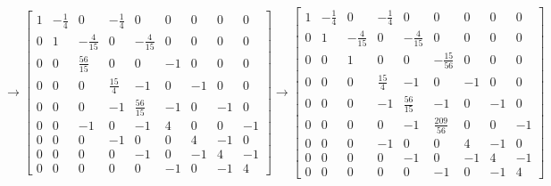 \documentclass[a4paper]{article}
\begin{document}
$$
\rightarrow\left[\begin{array}{ccccccccc}
	1 & -\frac{1}{4} & 0 & -\frac{1}{4} & 0 & 0 & 0 & 0 & 0 \\
	0 & 1 & -\frac{4}{15} & 0 & -\frac{4}{15} & 0 & 0 & 0 & 0 \\
	0 & 0 & \frac{56}{15} & 0 & 0 & -1 & 0 & 0 & 0 \\
	0 & 0 & 0 & \frac{15}{4} & -1 & 0 & -1 & 0 & 0 \\
	0 & 0 & 0 & -1 & \frac{56}{15} & -1 & 0 & -1 & 0 \\
	0 & 0 & -1 & 0 & -1 & 4 & 0 & 0 & -1 \\
	0 & 0 & 0 & -1 & 0 & 0 & 4 & -1 & 0 \\
	0 & 0 & 0 & 0 & -1 & 0 & -1 & 4 & -1 \\
	0 & 0 & 0 & 0 & 0 & -1 & 0 & -1 & 4
\end{array}\right] \rightarrow\left[\begin{array}{ccccccccc}
	1 & -\frac{1}{4} & 0 & -\frac{1}{4} & 0 & 0 & 0 & 0 & 0 \\
	0 & 1 & -\frac{4}{15} & 0 & -\frac{4}{15} & 0 & 0 & 0 & 0 \\
	0 & 0 & 1 & 0 & 0 & -\frac{15}{56} & 0 & 0 & 0 \\
	0 & 0 & 0 & \frac{15}{4} & -1 & 0 & -1 & 0 & 0 \\
	0 & 0 & 0 & -1 & \frac{56}{15} & -1 & 0 & -1 & 0 \\
	0 & 0 & 0 & 0 & -1 & \frac{209}{56} & 0 & 0 & -1 \\
	0 & 0 & 0 & -1 & 0 & 0 & 4 & -1 & 0 \\
	0 & 0 & 0 & 0 & -1 & 0 & -1 & 4 & -1 \\
	0 & 0 & 0 & 0 & 0 & -1 & 0 & -1 & 4
\end{array}\right]
$$
\end{document}
